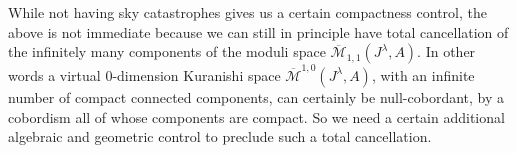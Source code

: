 \documentclass{amsart}
\numberwithin{equation}{section}
\newtheorem{lemma}[equation]{Lemma}
\newtheorem{definition}[equation]{Definition}
\theoremstyle{definition}
\theoremstyle{remark}
\DeclareMathOperator {\energy} {energy}
\DeclareMathOperator{\lcs}{lcs}
\begin{document}
While not having sky catastrophes gives us a certain compactness control, the above is not immediate because we can still in principle have total cancellation of the infinitely many components of the moduli space $\overline{\mathcal{M}} _{1,1} (J ^{\lambda}, A ) $.
In other words a virtual 0-dimension Kuranishi space $\overline{\mathcal{M}} ^{1,0} (J ^{\lambda}, A ) $, with an infinite number of compact connected components, can certainly be null-cobordant, by a cobordism all of whose components are compact.  So we need a certain additional algebraic and geometric control to preclude such a total cancellation. 
\end{document}
